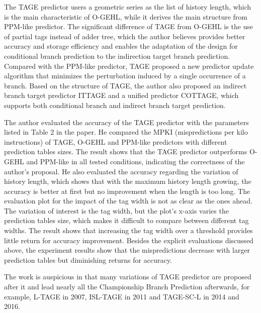 \documentclass[screen,nonacm,sigconf]{acmart}
\begin{document}
The TAGE predictor users a geometric series as the list of history length,
which is the main characteristic of O-GEHL\cite{Seznec05isca},
while it derives the main structure from PPM-like predictor\cite{Michaud05jilp}.
%
The significant difference of TAGE from O-GEHL is the use of partial tags instead of adder tree, which the author believes provides better accuracy and storage efficiency and enables the adaptation of the design for conditional branch prediction to the indirection target branch prediction.
Compared with the PPM-like predictor, TAGE proposed a new predictor update algorithm that minimizes the perturbation induced by a single occurrence of a branch.
%
Based on the structure of TAGE, the author also proposed an indirect branch target predictor ITTAGE and a unified predictor COTTAGE, which supports both conditional branch and indirect branch target prediction.

The author evaluated the accuracy of the TAGE predictor with the parameters listed in Table 2 in the paper.
He compared the MPKI (mispredictions per kilo instructions) of TAGE, O-GEHL and PPM-like predictors with different prediction tables sizes.
The result shows that the TAGE predictor outperforms O-GEHL and PPM-like in all tested conditions, indicating the correctness of the author's proposal.
He also evaluated the accuracy regarding the variation of history length, which shows that with the maximum history length growing, the accuracy is better at first but no improvement when the length is too long.
The evaluation plot for the impact of the tag width is not as clear as the ones ahead.
The variation of interest is the tag width, but the plot's x-axis varies the prediction tables size, which makes it difficult to compare between different tag widths.
The result shows that increasing the tag width over a threshold provides little return for accuracy improvement.
Besides the explicit evaluations discussed above, the experiment results show that the mispredictions decrease with larger prediction tables but diminishing returns for accuracy.


The work is auspicious in that many variations of TAGE predictor are proposed after it and lead nearly all the Championship Branch Prediction afterwards, for example, L-TAGE\cite{Seznec07jilp} in 2007, ISL-TAGE\cite{Seznec11hal} in 2011 and TAGE-SC-L\cite{Seznec14hal,Seznec16hal} in 2014 and 2016.
\end{document}

